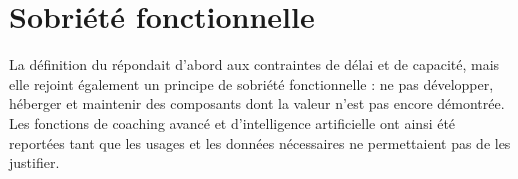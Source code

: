 \section{Sobriété fonctionnelle}

La définition du  répondait d'abord aux contraintes de délai et de capacité, mais elle rejoint également un principe de sobriété fonctionnelle : ne pas développer, héberger et maintenir des composants dont la valeur n'est pas encore démontrée. Les fonctions de coaching avancé et d'intelligence artificielle ont ainsi été reportées tant que les usages et les données nécessaires ne permettaient pas de les justifier.
